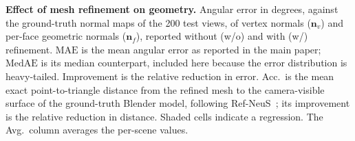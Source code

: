 \begin{table}[t]
\centering
\small
\setlength{\tabcolsep}{4pt}
\caption{\textbf{Effect of mesh refinement on geometry.}
Angular error in degrees, against the ground-truth normal maps of the 200 test views, of vertex normals ($\mathbf{n}_v$) and per-face
geometric normals ($\mathbf{n}_f$), reported without (w/o) and with (w/)
refinement. $\mathrm{MAE}$ is the mean angular error as reported in the main
paper; $\mathrm{MedAE}$ is its median counterpart, included here because the
error distribution is heavy-tailed. Improvement is the relative reduction in
error. Acc.\ is the mean exact point-to-triangle distance from the refined mesh to the
camera-visible surface of the ground-truth Blender model, following Ref-NeuS~\citep{ref-neus}; its improvement is
the relative reduction in distance. Shaded cells indicate a regression. The Avg.\ column averages
the per-scene values.}
\label{tab:mesh_normal}


\end{table}
